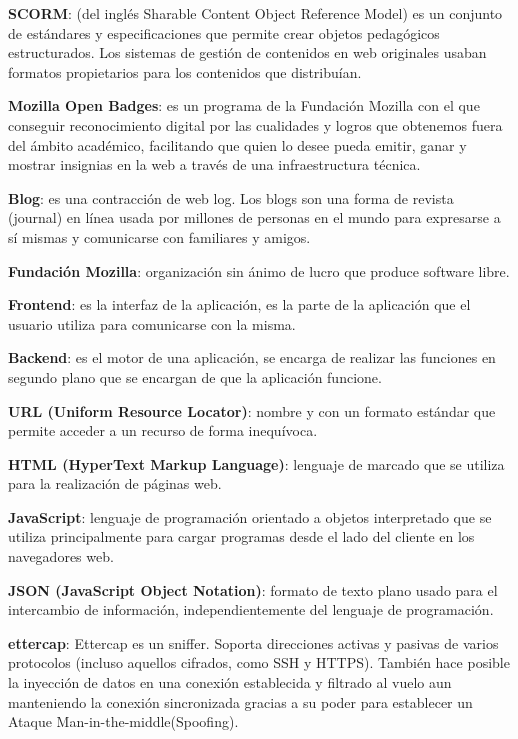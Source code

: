 \textbf{SCORM}: (del inglés Sharable Content Object Reference Model) es un conjunto de estándares y especificaciones que permite crear objetos pedagógicos estructurados. Los sistemas de gestión de contenidos en web originales usaban formatos propietarios para los contenidos que distribuían.
\bigskip

\textbf{Mozilla Open Badges}: es un programa de la Fundación Mozilla con el que conseguir reconocimiento digital por las cualidades y logros que obtenemos fuera del ámbito académico, facilitando que quien lo desee pueda emitir, ganar y mostrar insignias en la web a través de una infraestructura técnica.
\bigskip

\textbf{Blog}: es una contracción de web log. Los blogs son una forma de revista (journal) en línea usada por millones de personas en el mundo para expresarse a sí mismas y comunicarse con familiares y amigos.
\bigskip

\textbf{Fundación Mozilla}: organización sin ánimo de lucro que produce software libre.
\bigskip

\textbf{Frontend}: es la interfaz de la aplicación, es la parte de la aplicación que el usuario utiliza para comunicarse con la misma.
\bigskip

\textbf{Backend}: es el motor de una aplicación, se encarga de realizar las funciones en segundo plano que se encargan de que la aplicación funcione.
\bigskip

\textbf{URL (Uniform Resource Locator)}: nombre y con un formato estándar que permite acceder a un recurso de forma inequívoca.
\bigskip

\textbf{HTML (HyperText Markup Language)}: lenguaje de marcado que se utiliza para la realización de páginas web.
\bigskip

\textbf{JavaScript}: lenguaje de programación orientado a objetos interpretado que se utiliza principalmente para cargar programas desde el lado del cliente en los navegadores web.
\bigskip

\textbf{JSON (JavaScript Object Notation)}: formato de texto plano usado para el intercambio de información, independientemente del lenguaje de programación.
\bigskip

\textbf{ettercap}: Ettercap es un sniffer. Soporta direcciones activas y pasivas de varios protocolos (incluso aquellos cifrados, como SSH y HTTPS). También hace posible la inyección de datos en una conexión establecida y filtrado al vuelo aun manteniendo la conexión sincronizada gracias a su poder para establecer un Ataque Man-in-the-middle(Spoofing).
\bigskip

